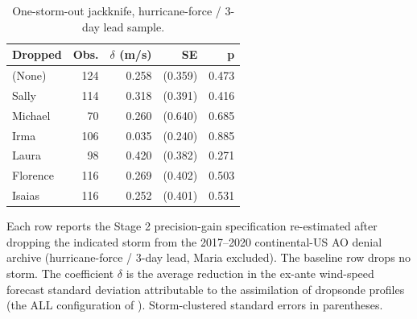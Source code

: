 \begin{table}

\caption{One-storm-out jackknife, hurricane-force / 3-day lead sample. \label{tab:appB_jackknife}}
\centering
\begin{threeparttable}
\begin{tabular}[t]{lrrrr}
\toprule
Dropped & Obs. & $\delta$ (m/s) & SE & p\\
\midrule
(None) & 124 & 0.258 & (0.359) & 0.473\\
Sally & 114 & 0.318 & (0.391) & 0.416\\
Michael & 70 & 0.260 & (0.640) & 0.685\\
Irma & 106 & 0.035 & (0.240) & 0.885\\
Laura & 98 & 0.420 & (0.382) & 0.271\\
Florence & 116 & 0.269 & (0.402) & 0.503\\
Isaias & 116 & 0.252 & (0.401) & 0.531\\
\bottomrule
\end{tabular}
\begin{tablenotes}
\small
\item Each row reports the Stage 2 precision-gain specification re-estimated after dropping the indicated storm from the 2017--2020 continental-US AO denial archive (hurricane-force / 3-day lead, Maria excluded). The baseline row drops no storm. The coefficient $\delta$ is the average reduction in the ex-ante wind-speed forecast standard deviation attributable to the assimilation of dropsonde profiles (the ALL configuration of \citet{DitchekEA2023}). Storm-clustered standard errors in parentheses.
\end{tablenotes}
\end{threeparttable}
\end{table}
